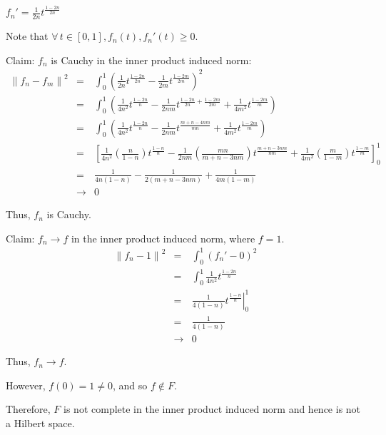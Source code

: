 \documentclass[letterpaper,12pt,fleqn]{article}
\newcommand{\norm}[1]{\left\|#1\right\|}
\begin{document}
\begin{enumerate}[label=(\alph*)]

  $f_n'=\frac{1}{2n}t^{\frac{1-2n}{2n}}$
  
  Note that $\forall\,t\in[0,1],f_n(t),f_n'(t)\ge0$.

  Claim: $f_n$ is Cauchy in the inner product induced norm:
  \begin{eqnarray*}
    \norm{f_n-f_m}^2 &=& \int_0^1\left(\frac{1}{2n}t^{\frac{1-2n}{2n}}-
    \frac{1}{2m}t^{\frac{1-2m}{2m}}\right)^2 \\
    &=& \int_0^1\left(\frac{1}{4n^2}t^{\frac{1-2n}{n}}-
    \frac{1}{2nm}t^{\frac{1-2n}{2n}+\frac{1-2m}{2m}}+\frac{1}{4m^2}t^{\frac{1-2m}{m}}
    \right) \\
    &=& \int_0^1\left(\frac{1}{4n^2}t^{\frac{1-2n}{n}}-
    \frac{1}{2nm}t^{\frac{m+n-4nm}{mn}}+\frac{1}{4m^2}t^{\frac{1-2m}{m}}\right) \\
    &=& \left[\frac{1}{4n^2}\left(\frac{n}{1-n}\right)t^{\frac{1-n}{n}}-
      \frac{1}{2nm}\left(\frac{mn}{m+n-3nm}\right)t^{\frac{m+n-3nm}{nm}}+
      \frac{1}{4m^2}\left(\frac{m}{1-m}\right)t^{\frac{1-m}{m}}
      \right]_0^1 \\
    &=& \frac{1}{4n(1-n)}-\frac{1}{2(m+n-3nm)}+\frac{1}{4m(1-m)} \\
    &\to& 0
  \end{eqnarray*}

  Thus, $f_n$ is Cauchy.

  Claim: $f_n\to f$ in the inner product induced norm, where $f=1$.
  \begin{eqnarray*}
    \norm{f_n-1}^2 &=& \int_0^1(f_n'-0)^2 \\
    &=& \int_0^1\frac{1}{4n^2}t^{\frac{1-2n}{n}} \\
    &=& \left.\frac{1}{4(1-n)}t^{\frac{1-n}{n}}\right|_0^1 \\
    &=& \frac{1}{4(1-n)} \\
    &\to& 0
  \end{eqnarray*}

  Thus, $f_n\to f$.

  However, $f(0)=1\ne0$, and so $f\notin F$.

  Therefore, $F$ is not complete in the inner product induced norm and hence is
  not a Hilbert space.
\end{enumerate}
\end{document}
